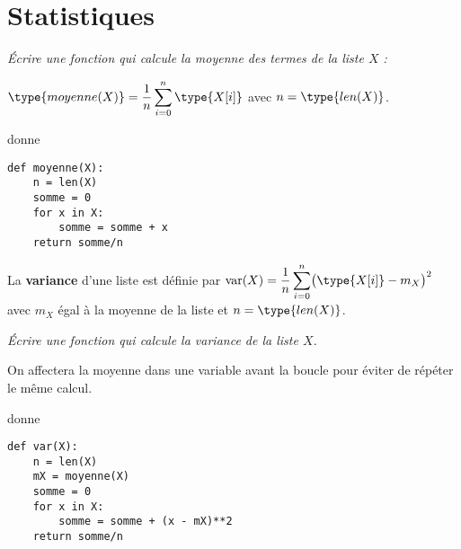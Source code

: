 \section{Statistiques} 
\begin{Exercise}[title = Moyenne]
\it Écrire une fonction  qui calcule la moyenne des termes de la liste $X$ :

$\displaystyle \type{moyenne(X)} = \frac 1n \sum_{i=0}^n \type{X[i]}$ avec $n = \type{len(X)}$.

 donne 
\end{Exercise}
\begin{Answer}
\begin{lstlisting}
def moyenne(X):
    n = len(X)
    somme = 0
    for x in X:
        somme = somme + x
    return somme/n
\end{lstlisting}
\end{Answer}
\bigskip

La {\bf variance} d'une liste est définie par $\displaystyle \text{var}(X) =  \frac 1n \sum_{i=0}^n \bigl(\type{X[i]} -m_X\bigr)^2$ avec $m_X$ égal à la moyenne de la liste et $n = \type{len(X)}$.
\begin{Exercise}[title = Variance]
\it Écrire une fonction  qui calcule la variance de la liste $X$.

On affectera la moyenne dans une variable avant la boucle pour éviter de répéter le même calcul.

 donne 
\end{Exercise}
\begin{Answer}
\begin{lstlisting}
def var(X):
    n = len(X)
    mX = moyenne(X)
    somme = 0
    for x in X:
        somme = somme + (x - mX)**2
    return somme/n
\end{lstlisting}
\end{Answer}
\bigskip

